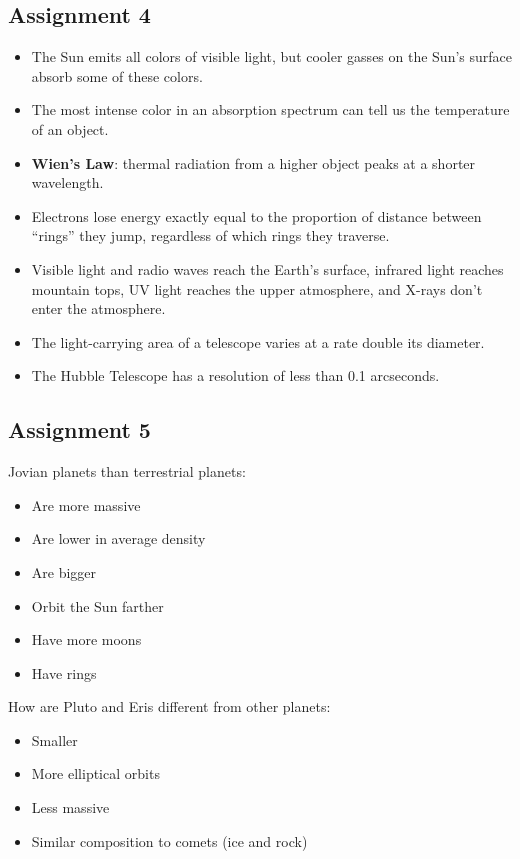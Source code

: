 \subsection{Assignment 4}
\begin{itemize}
\item The Sun emits all colors of visible light, but cooler gasses on the Sun's surface absorb some of these colors.
\item The most intense color in an absorption spectrum can tell us the temperature of an object.
\item {\bf Wien's Law}: thermal radiation from a higher object peaks at a shorter wavelength.
\item Electrons lose energy exactly equal to the proportion of distance between ``rings'' they jump, regardless of which rings they traverse.
\item Visible light and radio waves reach the Earth's surface, infrared light reaches mountain tops, UV light reaches the upper atmosphere, and X-rays don't enter the atmosphere.
\item The light-carrying area of a telescope varies at a rate double its diameter.
\item The Hubble Telescope has a resolution of less than 0.1 arcseconds.
\end{itemize}

\subsection{Assignment 5}
Jovian planets \underline{\hspace{5em}} than terrestrial planets:
\begin{itemize}
\item Are more massive
\item Are lower in average density
\item Are bigger
\item Orbit the Sun farther
\item Have more moons
\item Have rings
\end{itemize}

How are Pluto and Eris different from other planets:
\begin{itemize}
\item Smaller
\item More elliptical orbits
\item Less massive
\item Similar composition to comets (ice and rock)
\end{itemize}

